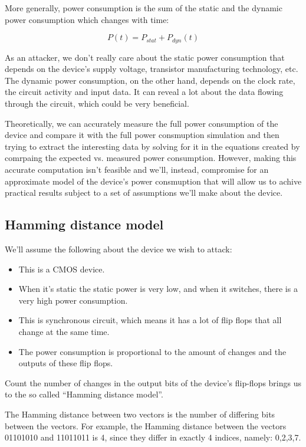 More generally, power consumption is the sum of the static and the dynamic power
consumption which changes with time: 

\begin{displaymath}
    P(t)=P_{stat} + P_{dyn}(t)
\end{displaymath}

As an attacker, we don't really care about the static power consumption that depends on the device's supply voltage, transistor manufacturing technology, etc.
The dynamic power consumption, on the other hand, depends on the clock rate, the circuit activity and input data. It can reveal a lot about the data flowing through the circuit, which could be very beneficial.

Theoretically, we can accurately measure the full power consumption of the device and compare it with the full power consmuption simulation and then trying to extract the interesting data by solving for it in the equations created by comrpaing the expected vs. measured power consumption.
However, making this accurate computation isn't feasible and we'll, instead, compromise for an approximate model of the device's power consmuption that will allow us to achive practical results subject to a set of assumptions we'll make about the device.

\subsection {Hamming distance model}
We'll assume the following about the device we wish to attack:
\begin{itemize}
    \item This is a CMOS device.
    \item When it's static the static power is very low, and when it switches,
    there is a very high power consumption.
    \item This is synchronous circuit, which means it has a lot of flip flops
    that all change at the same time.
    \item The power consumption is proportional to the amount of changes and the
    outputs of these flip flops.
\end{itemize}

Count the number of changes in the output bits of the device's flip-flops brings us to the so called ``Hamming distance model''. 

The Hamming distance between two vectors is the number of differing bits between the vectors. 
For example, the Hamming distance between the vectors 01101010 and 11011011 is 4, since they differ in exactly 4 indices, namely: 0,2,3,7.


